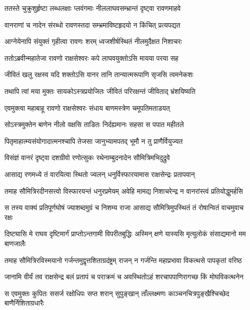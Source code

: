 \twolineshloka
{ततस्ते चुक्रुशुर्हृष्टा लब्धलक्षाः प्लवंगमाः}
{नीललाघवसम्भ्रान्तं दृष्ट्वा रावणमाहवे} %

\twolineshloka
{वानराणां च नादेन संरब्धो रावणस्तदा}
{सम्भ्रमाविष्टहृदयो न किंचित् प्रत्यपद्यत} %

\twolineshloka
{आग्नेयेनापि संयुक्तं गृहीत्वा रावणः शरम्}
{ध्वजशीर्षस्थितं नीलमुदैक्षत निशाचरः} %

\twolineshloka
{ततोऽब्रवीन्महातेजा रावणो राक्षसेश्वरः}
{कपे लाघवयुक्तोऽसि मायया परया सह} %

\twolineshloka
{जीवितं खलु रक्षस्व यदि शक्तोऽसि वानर}
{तानि तान्यात्मरूपाणि सृजसि त्वमनेकशः} %

\twolineshloka
{तथापि त्वां मया मुक्तः सायकोऽस्त्रप्रयोजितः}
{जीवितं परिरक्षन्तं जीविताद् भ्रंशयिष्यति} %

\twolineshloka
{एवमुक्त्वा महाबाहू रावणो राक्षसेश्वरः}
{संधाय बाणमस्त्रेण चमूपतिमताडयत्} %

\twolineshloka
{सोऽस्त्रमुक्तेन बाणेन नीलो वक्षसि ताडितः}
{निर्दह्यमानः सहसा स पपात महीतले} %

\twolineshloka
{पितृमाहात्म्यसंयोगादात्मनश्चापि तेजसा}
{जानुभ्यामपतद् भूमौ न तु प्राणैर्वियुज्यत} %

\twolineshloka
{विसंज्ञं वानरं दृष्ट्वा दशग्रीवो रणोत्सुकः}
{रथेनाम्बुदनादेन सौमित्रिमभिदुद्रुवे} %

\twolineshloka
{आसाद्य रणमध्ये तं वारयित्वा स्थितो ज्वलन्}
{धनुर्विस्फारयामास राक्षसेन्द्रः प्रतापवान्} %

\twolineshloka
{तमाह सौमित्रिरदीनसत्त्वो विस्फारयन्तं धनुरप्रमेयम्}
{अवेहि मामद्य निशाचरेन्द्र न वानरांस्त्वं प्रतियोद्धुमर्हसि} %

\twolineshloka
{स तस्य वाक्यं प्रतिपूर्णघोषं ज्याशब्दमुग्रं च निशम्य राजा}
{आसाद्य सौमित्रिमुपस्थितं तं रोषान्वितं वाचमुवाच रक्षः} %

\twolineshloka
{दिष्ट्यासि मे राघव दृष्टिमार्गं प्राप्तोऽन्तगामी विपरीतबुद्धिः}
{अस्मिन् क्षणे यास्यसि मृत्युलोकं संसाद्यमानो मम बाणजालैः} %

\twolineshloka
{तमाह सौमित्रिरविस्मयानो गर्जन्तमुद्वृत्तशिताग्रदंष्ट्रम्}
{राजन् न गर्जन्ति महाप्रभावा विकत्थसे पापकृतां वरिष्ठ} %

\twolineshloka
{जानामि वीर्यं तव राक्षसेन्द्र बलं प्रतापं च पराक्रमं च}
{अवस्थितोऽहं शरचापपाणिरागच्छ किं मोघविकत्थनेन} %

\twolineshloka
{स एवमुक्तः कुपितः ससर्ज रक्षोधिपः सप्त शरान् सुपुङ्खान्}
{ताँल्लक्ष्मणः काञ्चनचित्रपुङ्खैश्चिच्छेद बाणैर्निशिताग्रधारैः} %

